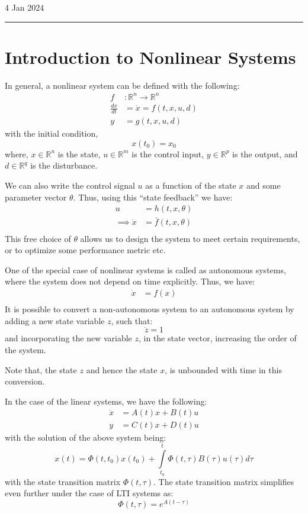 \hfill\small{4 Jan 2024}
\vspace{0.5em}
\hrule
\vspace{-0.5em}
\section{Introduction to Nonlinear Systems}

In general, a nonlinear system can be defined with the following:
\[
    \begin{aligned}
        f &: \mathbb{R}^n \to \mathbb{R}^n \\
        \frac{dx}{dt} &= \dot{x} = f(t,x,u,d)  \\
        y &= g(t,x,u,d)
    \end{aligned}
\]
with the initial condition,
\[
    x(t_0) = x_0  
\]
where, \( x \in \mathbb{R}^n \) is the state, \( u \in \mathbb{R}^m \) is the control
input, \( y \in \mathbb{R}^p \) is the output, and \( d \in \mathbb{R}^q \) is the 
disturbance.

We can also write the control signal \(u\) as a function of the state \(x\) and some 
parameter vector \(\theta\). Thus, using this ``state feedback'' we have:
\[
    \begin{aligned}
        u &= h(t,x,\theta) \\
        \implies \dot{x} &= \bar{f} (t,x,\theta) \\
    \end{aligned}
\]
This free choice of \(\theta\) allows us to design the system to meet certain requirements, or
to optimize some performance metric etc.

One of the special case of nonlinear systems is called as autonomous systems, where the
system does not depend on time explicitly. Thus, we have:
\[
    \begin{aligned}
        \dot{x} &= f(x) \\
    \end{aligned}
\]
It is possible to convert a non-autonomous system to an autonomous system by adding a
new state variable \(z\), such that:
\[
    \dot{z} = 1   
\]
and incorporating the new variable \(z\), in the state vector, increasing the order of the 
system.
\begin{note}
    Note that, the state \(z\) and hence the state \(x\), is unbounded with time in this 
    conversion.
\end{note}  

In the case of the linear systems, we have the following:
\[
    \begin{aligned}
        \dot{x} & = A(t) x + B(t) u \\
        y &= C(t) x + D(t) u 
    \end{aligned}  
\]
with the solution of the above system being:
\[
    x(t) = \Phi(t,t_0) x(t_0) + \int\limits_{t_0}^{t} \Phi(t,\tau) B(\tau) u(\tau) d\tau
\]
with the state transition matrix \(\Phi(t,\tau)\). The state transition matrix simplifies
even further under the case of LTI systems as:
\[
    \Phi(t,\tau) = e^{A(t-\tau)}  
\]

